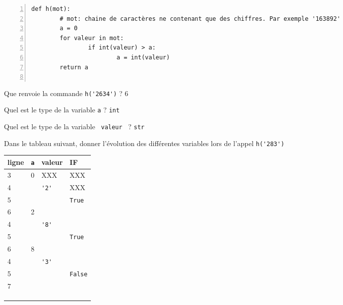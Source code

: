 \documentclass[a4paper,12pt,openany]{book}
\begin{document}
\begin{minipage}{9cm}
\begin{lstlisting}[numbers=left]
def h(mot):
		# mot: chaine de caractères ne contenant que des chiffres. Par exemple '163892' 
		a = 0
		for valeur in mot:
				if int(valeur) > a:
						a = int(valeur)
		return a
		
\end{lstlisting}

\begin{liste}
	\item 	Que renvoie la commande \verb+h('2634')+ ? 6
	
	\dotfill
	
	\item Quel est le type de la variable \verb+a+ ? \verb+int+
	
	\item Quel est le type de la variable \verb+ valeur + ? \verb+str+
	 
	\end{liste}
\end{minipage}
\begin{minipage}{9cm}
\begin{liste}
	\item Dans le tableau suivant, donner l'évolution des différentes variables lors de l'appel \verb+h('283')+
	
\renewcommand{\arraystretch}{1.2}	
\begin{tabular}{|p{1.5cm}|p{1cm}|p{2cm}|p{2cm}|}
\hline
ligne & \verb+a+ & valeur & IF  \\ \hline
3 & 0 & XXX&XXX\\ \hline
4 &  & \verb+'2'+&XXX\\ \hline
5 & & & \verb+True+\\ \hline
6 & 2 & &\\ \hline
4 & & \verb+'8'+&\\ \hline
5 & & & \verb+True+\\ \hline
6 & 8 & &\\ \hline
4 & &\verb+'3'+ &\\ \hline
5 & & & \verb+False+\\ \hline
7 & & &\\ \hline
 & & &\\ \hline
 & & &\\ \hline
 & & &\\ \hline


\end{tabular}	
	
\end{liste}
\end{minipage}	
\end{document}
